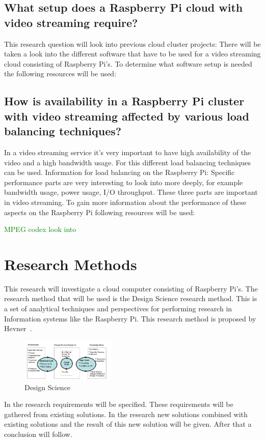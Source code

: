 \documentclass{sig-alternate-br}
\newcommand\todo[1]{
	\textcolor{green}{#1}
	}
\begin{document}
\subsection{What setup does a Raspberry Pi cloud with video streaming require?}
This research question will look into previous cloud cluster projects: 
\cite{abrahamsson:2013,southampton, tso:2013, beloglazov:2010,cox:2014} \newline
There will be taken a look into the different software that have to be used for a video streaming cloud consisting of Raspberry Pi's. To determine what software setup is needed the following resources will be used: 
\cite{raspberry-video,video-1080p, permission, nmon,bandwidth,ab, mosberger1998httperf, httperf-2, raspbian} 

\subsection{How is availability in a Raspberry Pi cluster with video streaming affected by various load balancing techniques?}
In a video streaming service it's very important to have high  availability of the video and a high bandwidth usage. For this different load balancing techniques can be used. Information for load balancing on the Raspberry Pi:
\cite{nginx-load-balancing,nginx-load-balancing-2, nginx-load-balancing-3, Raspberry-media-server, dropbox-clone} \newline
Specific performance parts are very interesting to look into more deeply, for example bandwidth usage, power usage, I/O throughput. These three parts are important in video streaming. To gain more information about the performance of these aspects on the Raspberry Pi following resources will be used: 
\cite{nmon,bandwidth,ab}

\todo{ MPEG codex look into}

\section{Research Methods}
This research will investigate a cloud computer consisting of Raspberry Pi's. The research method that will be used is the Design Science research method. This is a set of analytical techniques and perspectives for performing research in Information systems like the Raspberry Pi. This research method is proposed by Hevner~\cite{hevner:2007}. 
\begin{figure}[H]
	\centering 
	\includegraphics[width=0.4\textwidth]{Design_science.png}
	\caption{Design Science}
	\label{fig:design} %
\end{figure}
In the research requirements will be specified. These requirements will be gathered from existing solutions. In the research new solutions combined with existing solutions and the result of this new solution will be given. After that a conclusion will follow. 
\end{document}
